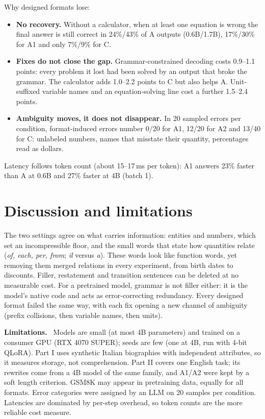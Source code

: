\documentclass[10pt,a4paper,twocolumn]{article}
\renewcommand{\paragraph}[1]{\par\textbf{#1}\ }
\begin{document}
Why designed formats lose:
\begin{itemize}
\item \textbf{No recovery.} Without a calculator, when at least one equation is wrong the final answer is still correct in 24\%/43\% of A outputs (0.6B/1.7B), 17\%/30\% for A1 and only 7\%/9\% for C.
\item \textbf{Fixes do not close the gap.} Grammar-constrained decoding costs 0.9--1.1 points: every problem it lost had been solved by an output that broke the grammar. The calculator adds 1.0--2.2 points to C but also helps A. Unit-suffixed variable names and an equation-solving line cost a further 1.5--2.4 points.
\item \textbf{Ambiguity moves, it does not disappear.} In 20 sampled errors per condition, format-induced errors number 0/20 for A1, 12/20 for A2 and 13/40 for C: unlabeled numbers, names that misstate their quantity, percentages read as dollars.
\end{itemize}
Latency follows token count (about 15--17\,ms per token): A1 answers 23\% faster than A at 0.6B and 27\% faster at 4B (batch 1).

\section{Discussion and limitations}
The two settings agree on what carries information: entities and numbers, which set an incompressible floor, and the small words that state how quantities relate (\emph{of, each, per, from}; \emph{il} versus \emph{a}). These words look like function words, yet removing them merged relations in every experiment, from birth dates to discounts. Filler, restatement and transition sentences can be deleted at no measurable cost. For a pretrained model, grammar is not filler either: it is the model's native code and acts as error-correcting redundancy. Every designed format failed the same way, with each fix opening a new channel of ambiguity (prefix collisions, then variable names, then units).

\paragraph{Limitations.} Models are small (at most 4B parameters) and trained on a consumer GPU (RTX 4070 SUPER); seeds are few (one at 4B, run with 4-bit QLoRA). Part I uses synthetic Italian biographies with independent attributes, so it measures storage, not comprehension. Part II covers one English task; its rewrites come from a 4B model of the same family, and A1/A2 were kept by a soft length criterion. GSM8K may appear in pretraining data, equally for all formats. Error categories were assigned by an LLM on 20 samples per condition. Latencies are dominated by per-step overhead, so token counts are the more reliable cost measure.
\end{document}
